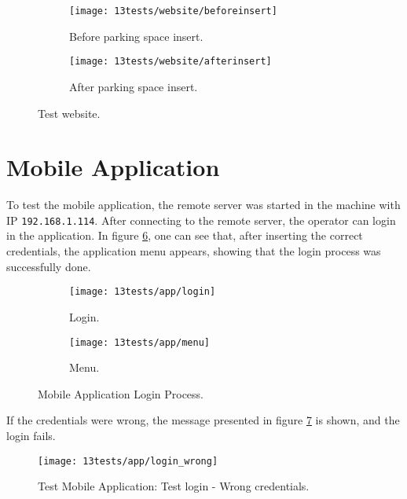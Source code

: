 \begin{figure}[H]
	\centering
	\begin{subfigure}{.4\textwidth}
		\centering
		\texttt{[image: 13tests/website/beforeinsert]}
		\caption{Before parking space insert.}
		\label{fig:login}
	\end{subfigure}%
	\begin{subfigure}{.4\textwidth}
		\centering
		\texttt{[image: 13tests/website/afterinsert]}
		\caption{After parking space insert.}
		\label{fig:menu}
	\end{subfigure}
	\caption{Test website.}
	\label{fig:applogin}
\end{figure}

\clearpage
\section{Mobile Application}

To test the mobile application, the remote server was started in the machine with IP \verb|192.168.1.114|. After connecting to the remote server, the operator can login in the application. In figure \ref{fig:applogin}, one can see that, after inserting the correct credentials, the application menu appears, showing that the login process was successfully done.

\begin{figure}[H]
	\centering
	\begin{subfigure}{.4\textwidth}
		\centering
		\texttt{[image: 13tests/app/login]}
		\caption{Login.}
		\label{fig:login}
	\end{subfigure}%
	\begin{subfigure}{.4\textwidth}
		\centering
		\texttt{[image: 13tests/app/menu]}
		\caption{Menu.}
		\label{fig:menu}
	\end{subfigure}
	\caption{Mobile Application Login Process.}
	\label{fig:applogin}
\end{figure}

If the credentials were wrong, the message presented in figure \ref{fig:login_wrong} is shown, and the login fails.

\begin{figure}[H]
	\centering	
	\texttt{[image: 13tests/app/login\_wrong]}
	\caption{Test Mobile Application: Test login - Wrong credentials.}
	\label{fig:login_wrong}
\end{figure}
